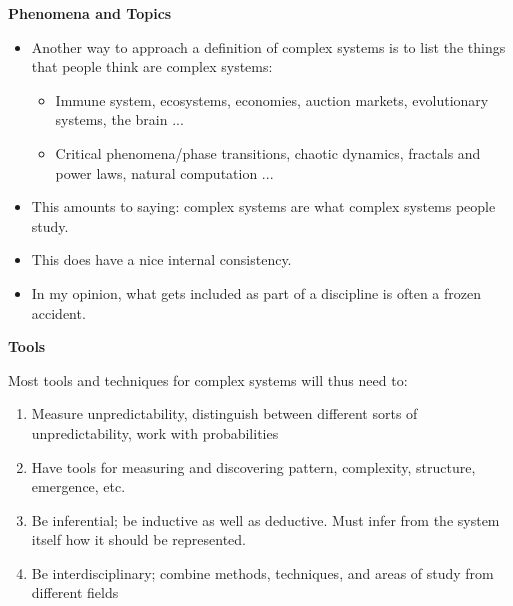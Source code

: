 \documentclass[%
  color,
  epsf,
  url,
  amssymb,
  semhelv,%
  portrait,%
  semlayer%
  ]{seminar}
\begin{document}
\begin{slide*}
\centerslidesfalse
\begin{center}
{\bf Phenomena and Topics}
\end{center}

\begin{itemize}
\item Another way to approach a definition of complex systems is to
list the things that people think are complex systems:
\begin{itemize}

\item Immune system, ecosystems, economies, auction markets,
evolutionary systems, the brain ...

\item Critical phenomena/phase transitions, chaotic dynamics, fractals
and power laws, natural computation ... 

\end{itemize}

\item This amounts to saying:  complex systems are what complex
systems people study.

\item This does have a nice internal consistency.

\item In my opinion, what gets included as part of a discipline is
often a frozen accident. 

\end{itemize}




\end{slide*}

\begin{slide*}
\centerslidesfalse
\begin{center}
{\bf Tools}
\end{center}

Most tools and techniques for complex systems will thus need to:
\begin{enumerate}

\item Measure unpredictability, distinguish between different sorts of
unpredictability, work with probabilities

\item Have tools for measuring and discovering pattern, complexity,
structure, emergence, etc. 

\item Be inferential; be inductive as well as deductive.  Must infer
from the system itself how it should be represented.   

\item Be interdisciplinary; combine methods, techniques, and areas of
study from different fields

\end{enumerate}

\end{slide*}
\end{document}
